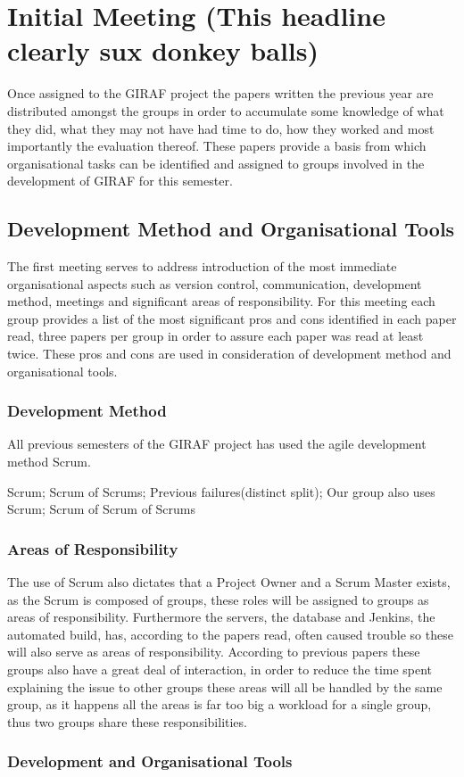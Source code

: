 \section{Initial Meeting (This headline clearly sux donkey balls)}
Once assigned to the GIRAF project the papers written the previous year are distributed amongst the groups in order to accumulate some knowledge of what they did, what they may not have had time to do,  how they worked and most importantly the evaluation thereof.
These papers provide a basis from which organisational tasks can be identified and assigned to groups involved in the development of GIRAF for this semester.

\subsection{Development Method and Organisational Tools}
The first meeting serves to address introduction of the most immediate organisational aspects such as version control, communication, development method, meetings and significant areas of responsibility.
For this meeting each group provides a list of the most significant pros and cons identified in each paper read, three papers per group in order to assure each paper was read at least twice.
These pros and cons are used in consideration of development method and organisational tools.

\subsubsection*{Development Method}
All previous semesters of the GIRAF project has used the agile development method Scrum.

Scrum; Scrum of Scrums; Previous failures(distinct split); Our group also uses Scrum; Scrum of Scrum of Scrums

\subsubsection*{Areas of Responsibility}
The use of Scrum also dictates that a Project Owner and a Scrum Master exists, as the Scrum is composed of groups, these roles will be assigned to groups as areas of responsibility.
Furthermore the servers, the database and Jenkins, the automated build, has, according to the papers read, often caused trouble so these will also serve as areas of responsibility.
According to previous papers these groups also have a great deal of interaction, in order to reduce the time spent explaining the issue to other groups these areas will all be handled by the same group, as it happens all the areas is far too big a workload for a single group, thus two groups share these responsibilities.

\subsubsection*{Development and Organisational Tools}

